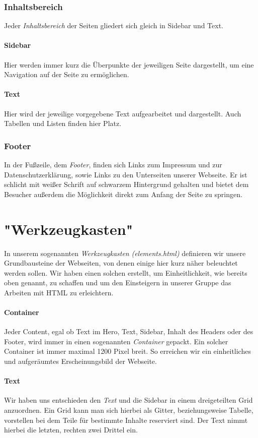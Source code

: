 \documentclass[12pt,a4paper]{article}
\begin{document}
\subsubsection{Inhaltsbereich}
Jeder \textit{Inhaltsbereich} der Seiten gliedert sich gleich in
Sidebar und Text.
\paragraph{Sidebar}
Hier werden immer kurz die Überpunkte der jeweiligen Seite dargestellt, um eine Navigation auf der Seite zu ermöglichen.
\paragraph{Text}
Hier wird der jeweilige vorgegebene Text aufgearbeitet und dargestellt. Auch Tabellen und Listen finden hier Platz.
\subsubsection{Footer}
In der Fußzeile, dem \textit{Footer}, finden sich Links zum Impressum und zur Datenschutzerklärung, sowie Links zu den Unterseiten unserer Webseite. Er ist schlicht mit weißer Schrift auf schwarzem Hintergrund gehalten und bietet dem Besucher außerdem die Möglichkeit direkt zum Anfang der Seite zu springen.
\section{"Werkzeugkasten"}
In unserem sogenannten \textit{Werkzeugkasten} \emph{(elements.html)} definieren wir unsere Grundbausteine der Webseiten, von denen einige hier kurz näher beleuchtet werden sollen. Wir haben einen solchen erstellt, um Einheitlichkeit, wie bereits oben genannt, zu schaffen und um den Einsteigern in unserer Gruppe das Arbeiten mit HTML zu erleichtern.
\paragraph{Container}
Jeder Content, egal ob Text im Hero, Text, Sidebar, Inhalt des Headers oder des Footer, wird immer in einen sogenannten \textit{Container} gepackt.
Ein solcher Container ist immer maximal 1200 Pixel breit. So erreichen wir ein einheitliches und aufgeräumtes Erscheinungsbild der Webseite.
\paragraph{Text}
Wir haben uns entschieden den \textit{Text} und die Sidebar in einem dreigeteilten Grid  anzuordnen. Ein Grid kann man sich hierbei als Gitter, beziehungsweise Tabelle, vorstellen  bei dem Teile für bestimmte Inhalte reserviert sind. Der Text nimmt hierbei die letzten, rechten zwei Drittel ein.
\end{document}
